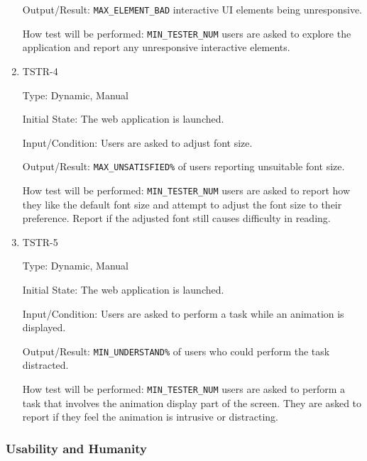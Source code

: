 \documentclass[12pt, titlepage]{article}
\begin{document}
\begin{enumerate}
Output/Result: \texttt{MAX\_ELEMENT\_BAD} interactive UI elements being unresponsive.
					
How test will be performed: \texttt{MIN\_TESTER\_NUM} users are asked to explore the application and report any unresponsive interactive elements.

\item{TSTR-4\\}\label{TSTR-4}

Type: Dynamic, Manual
					
Initial State: The web application is launched.
					
Input/Condition: Users are asked to adjust font size.
					
Output/Result: \texttt{MAX\_UNSATISFIED\%} of users reporting unsuitable font size.
					
How test will be performed: \texttt{MIN\_TESTER\_NUM} users are asked to report how they like the default font size and attempt to adjust the font size to their preference. Report if the adjusted font still causes difficulty in reading.

\item{TSTR-5\\}\label{TSTR-5}

Type: Dynamic, Manual
					
Initial State: The web application is launched.
					
Input/Condition: Users are asked to perform a task while an animation is displayed.
					
Output/Result: \texttt{MIN\_UNDERSTAND\%} of users who could perform the task distracted.
					
How test will be performed: \texttt{MIN\_TESTER\_NUM} users are asked to perform a task that involves the animation display part of the screen.  They are asked to report if they feel the animation is intrusive or distracting.
\end{enumerate}

\subsubsection{Usability and Humanity}
\end{document}
